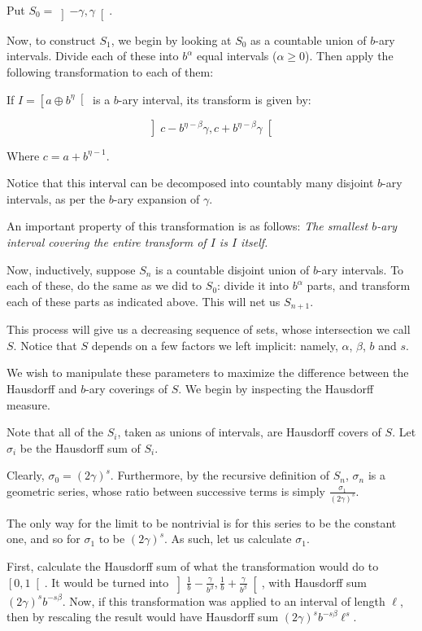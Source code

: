 \documentclass[11pt, reqno]{amsart}
\begin{document}
Put $S_0 = \left]-\gamma, \gamma\right[$.

Now, to construct $S_1$, we begin by looking at $S_0$ as a countable union of $b$-ary intervals. Divide each of these into $b^\alpha$ equal intervals ($\alpha \geq 0$). Then apply the following transformation to each of them:

If $I = \left[a \oplus b^\eta \right[$ is a $b$-ary interval, its transform is given by:

\[\left] c - b^{\eta - \beta} \gamma, c + b^{\eta - \beta} \gamma \right[\]

Where $c = a + b^{\eta - 1}$.

Notice that this interval can be decomposed into countably many disjoint $b$-ary intervals, as per the $b$-ary expansion of $\gamma$.

An important property of this transformation is as follows: \emph{The smallest $b$-ary interval covering the entire transform of $I$ is $I$ itself.}

Now, inductively, suppose $S_n$ is a countable disjoint union of $b$-ary intervals. To each of these, do the same as  we did to $S_0$: divide it into $b^\alpha$ parts, and transform each of these parts as indicated above. This will net us $S_{n+1}$.

This process will give us a decreasing sequence of sets, whose intersection we call $S$. Notice that $S$ depends on a few factors we left implicit: namely, $\alpha$, $\beta$, $b$ and $s$.

We wish to manipulate these parameters to maximize the difference between the Hausdorff and $b$-ary coverings of $S$. We begin by inspecting the Hausdorff measure.

Note that all of the $S_i$, taken as unions of intervals, are Hausdorff covers of $S$. Let $\sigma_i$ be the Hausdorff sum of $S_i$.

Clearly, $\sigma_0 = (2 \gamma)^s$. Furthermore, by the recursive definition of $S_n$, $\sigma_n$ is a geometric series, whose ratio between successive terms is simply $\frac{\sigma_1}{(2 \gamma)^s}$.

The only way for the limit to be nontrivial is for this series to be the constant one, and so for $\sigma_1$ to be $(2 \gamma)^s$. As such, let us calculate $\sigma_1$.

First, calculate the Hausdorff sum of what the transformation would do to $\left[0, 1 \right[$. It would be turned into $\left] \frac 1 b - \frac \gamma{b^\beta}, \frac 1 b + \frac \gamma{b^\beta} \right[$, with Hausdorff sum $(2 \gamma)^s b^{-s \beta}$. Now, if this transformation was applied to an interval of length $\ell$, then by rescaling the result would have Hausdorff sum $(2 \gamma)^s b^{-s \beta} \ell^s$.
\end{document}
